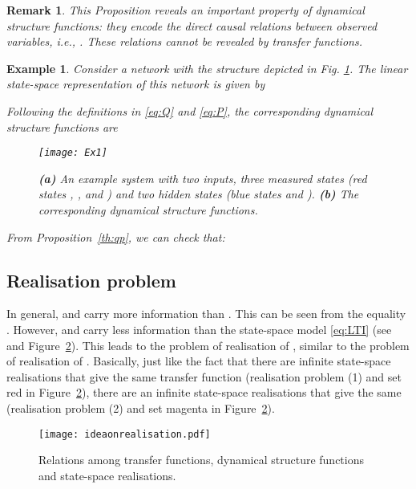 \documentclass[twocolumn,12pt]{autart}
\theoremstyle{plain}
\newtheorem{remark}{Remark}
\newtheorem{example}{Example}
\begin{document}
\begin{remark}
This Proposition reveals an important property of dynamical structure functions: they encode the direct causal relations between observed variables, i.e., . These relations cannot be revealed by transfer functions. 
\end{remark}


\begin{example} \label{ex1}
Consider a network with the structure depicted in Fig. \ref{fig:ex1}. The linear state-space representation of this network is given by

Following the definitions in \eqref{eq:Q} and \eqref{eq:P}, the corresponding dynamical structure functions  are

\begin{figure}[!] \centering
\texttt{[image: Ex1]}
\caption{\textbf{(a)} An example system with two inputs, three measured states (red states , , and ) and two hidden states (blue states  and ). \textbf{(b)} The corresponding dynamical structure functions.}
\label{fig:ex1}
\end{figure}
From Proposition~\ref{th:qp}, we can check that:

\end{example}




\subsection{Realisation problem}

In general,  and  carry more information than . This can be seen from the equality .  However,  and  carry less information than the state-space model \eqref{eq:LTI} (see~\cite{08net_rec,robust} and Figure~\ref{fig:problems}). This leads to the problem of realisation of , similar to the problem of realisation of . Basically, just like the fact that there are infinite state-space realisations that give the same transfer function (realisation problem (1) and set red in Figure~\ref{fig:problems}), there are an infinite state-space realisations that give the same  (realisation problem (2) and set magenta in Figure~\ref{fig:problems}).

\begin{figure}[h]
\centering
  \texttt{[image: ideaonrealisation.pdf]}
\caption{Relations among transfer functions, dynamical structure functions and state-space realisations.} \label{fig:problems}     
\end{figure}
\end{document}
